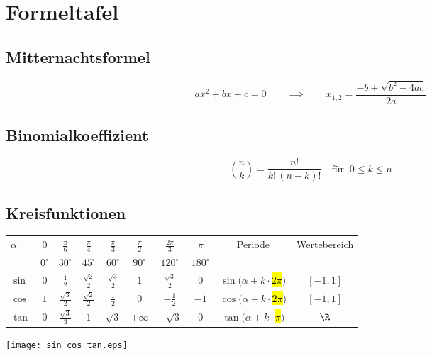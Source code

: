 \section{Formeltafel}
\subsection{Mitternachtsformel}
\[ a x^2 + b x + c = 0 \qquad \implies \qquad x_{1,2} = \frac{-b \pm
\sqrt{b^2-4ac}}{2a} \]

\subsection{Binomialkoeffizient}
\[ \binom nk = \frac{n!}{k!\,(n-k)!} \quad \mbox{für }\ 0\leq k\leq n \]

\subsection{Kreisfunktionen}
{\footnotesize
\begin{tabular}{|l||c|c|c|c|c|c|c||c|c|}\hline
\multirow{2}{*}{$\alpha$} & $0$ & $\frac{\pi}{6}$ & $\frac{\pi}{4}$ &
$\frac{\pi}{3}$ & $\frac{\pi}{2}$ & $\frac{2\pi}{3}$ & $\pi$ &
\multirow{2}{*}{Periode} & \multirow{2}{*}{Wertebereich}\\

& $0^\circ$ & $30^\circ$ & $45^\circ$ & $60^\circ$ & $90^\circ$ & $120^\circ$ &
$180^\circ$ & &\\ \hline

$\sin$ & $0$ & $\frac{1}{2}$ & $\frac{\sqrt{2}}{2}$ &
$\frac{\sqrt{3}}{2}$ & $1$ & $\frac{\sqrt{3}}{2}$ & $0$ & $\sin(\alpha +
k\cdot$\hl{$2\pi$}$)$ & $[-1,1]$\\ \hline

$\cos$ & $1$ & $\frac{\sqrt{3}}{2}$ & $\frac{\sqrt{2}}{2}$ & $\frac{1}{2}$ & $0$
& $-\frac{1}{2}$ & $-1$ & $\cos(\alpha + k\cdot$\hl{$2\pi$}$)$ & $[-1,1]$\\
\hline


$\tan$ & $0$ & $\frac{\sqrt{3}}{3}$ & $1$ & $\sqrt{3}$ & $\pm \infty$ &
$-\sqrt{3}$ & $0$ & $\tan(\alpha + k \cdot$\hl{$\pi$}$)$ & $\R$
\\
\hline
\end{tabular}
}
\texttt{[image: sin\_cos\_tan.eps]}

